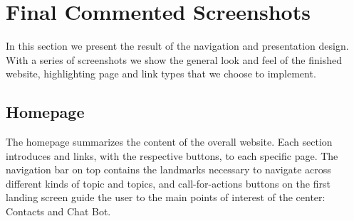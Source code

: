 \pagebreak
\section{Final Commented Screenshots}
In this section we present the result of the navigation and presentation design. With a series of screenshots we show the general look and feel of the finished website, highlighting page and link types that we choose to implement.


\subsection{Homepage}
The homepage summarizes the content of the overall website. Each section introduces and links, with the respective buttons, to each specific page.
The navigation bar on top contains the landmarks necessary to navigate across different kinds of topic and topics, and call-for-actions buttons on the first landing screen
guide the user to the main points of interest of the center: Contacts and Chat Bot.
\vspace{1em}

